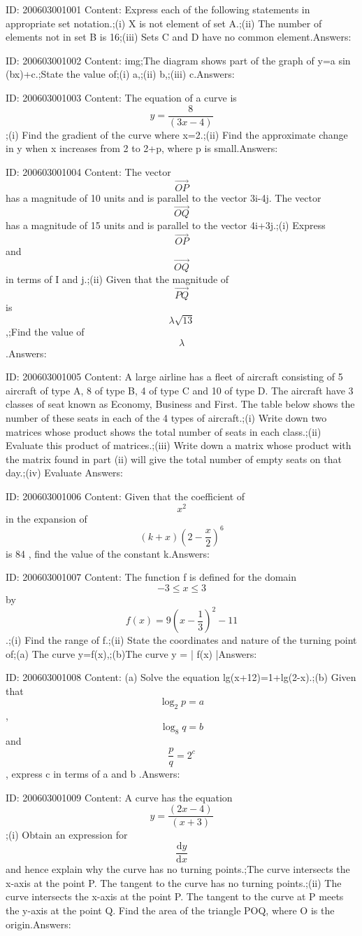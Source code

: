 \documentclass{article}
\begin{document}
ID: 200603001001
Content:
Express each of the following statements in appropriate set notation.;(i)	X is not element of set A.;(ii)	The number of elements not in set B is 16;(iii)	Sets C and D have no common element.Answers:

ID: 200603001002
Content:
img;The diagram shows part of the graph of y=a sin (bx)+c.;State the value of;(i)	a,;(ii)	b,;(iii)	c.Answers:

ID: 200603001003
Content:
The equation of a curve is $$y=\frac{8}{(3x-4)}$$;(i) Find the gradient of the curve where x=2.;(ii)	Find the approximate change in y when x increases from 2 to 2+p, where p is small.Answers:

ID: 200603001004
Content:
The vector $$\vec{OP}$$ has a magnitude of 10 units and is parallel to the vector 3i-4j. The vector $$\vec{OQ}$$ has a magnitude of 15 units and is parallel to the vector 4i+3j.;(i)	Express $$\vec{OP}$$ and $$\vec{OQ}$$ in terms of I and j.;(ii)	Given that the magnitude of $$\vec{PQ}$$ is $$\lambda \sqrt{13}$$,;Find the value of $$\lambda$$.Answers:

ID: 200603001005
Content:
A large airline has a fleet of aircraft consisting of 5 aircraft of type A, 8 of type B, 4 of type C and 10 of type D. The aircraft have 3 classes of seat known as Economy, Business and First. The table below shows the number of these seats in each of the 4 types of aircraft.;(i) Write down two matrices whose product shows the total number of seats in each class.;(ii) Evaluate this product of matrices.;(iii)	Write down a matrix whose product with the matrix found in part (ii) will give the total number of empty seats on that day.;(iv) Evaluate Answers:

ID: 200603001006
Content:
Given that the coefficient of $$x^2$$ in the expansion of $$(k+x)(2-\frac{x}{2})^6$$ is 84 , find the value of the constant k.Answers:

ID: 200603001007
Content:
The function f is defined for the domain $$-3\leq x\leq3$$ by $$f(x)=9(x-\frac{1}{3})^2-11$$.;(i)	Find the range of f.;(ii) State the coordinates and nature of the turning point of;(a) The curve y=f(x),;(b)The curve y = | f(x) |Answers:

ID: 200603001008
Content:
(a) Solve the equation lg(x+12)=1+lg(2-x).;(b)	Given that $$\log_2 p=a$$, $$\log_8 q=b$$ and $$\frac{p}{q}=2^c$$, express c in terms of a and b .Answers:

ID: 200603001009
Content:
A curve has the equation $$y=\frac{(2x-4)}{ (x+3)} $$;(i) Obtain an expression for $$\frac{\mathrm{d} y}{\mathrm{d} x}$$ and hence explain why the curve has no turning points.;The curve intersects the x-axis at the point P. The tangent to the curve has no turning points.;(ii) The curve intersects the x-axis at the point P. The tangent to the curve at P meets the y-axis at the point Q. Find the area of the triangle POQ, where O is the origin.Answers:
\end{document}
